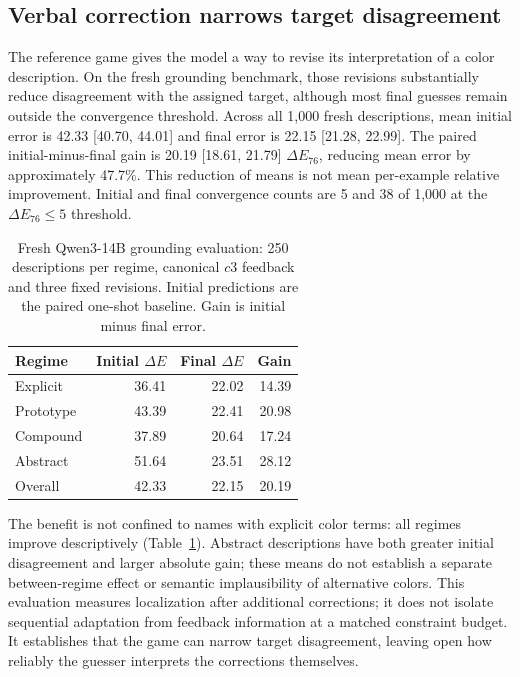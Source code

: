 \documentclass[11pt]{article}
\begin{document}
\subsection{Verbal correction narrows target disagreement}
\label{sec:results_main}
The reference game gives the model a way to revise its interpretation of a
color description. On the fresh grounding benchmark, those revisions
substantially reduce disagreement with the assigned target, although
most final guesses remain outside the convergence threshold.
Across all 1{,}000 fresh descriptions, mean initial error is 42.33
[40.70, 44.01] and final error is 22.15 [21.28, 22.99]. The paired
initial-minus-final gain is 20.19 [18.61, 21.79] $\Delta E_{76}$, reducing
mean error by approximately 47.7\%. This reduction of means is not mean
per-example relative improvement. Initial and final convergence counts
are 5 and 38 of 1{,}000 at the $\Delta E_{76}\leq5$ threshold.

\begin{table}[t]
\centering\small
\begin{tabular}{@{}lrrr@{}}
\toprule
Regime & Initial $\Delta E$ & Final $\Delta E$ & Gain \\
\midrule
Explicit & 36.41 & 22.02 & 14.39 \\
Prototype & 43.39 & 22.41 & 20.98 \\
Compound & 37.89 & 20.64 & 17.24 \\
Abstract & 51.64 & 23.51 & 28.12 \\
Overall & 42.33 & 22.15 & 20.19 \\
\bottomrule
\end{tabular}
\caption{Fresh Qwen3-14B grounding evaluation: 250 descriptions per regime,
canonical $c3$ feedback and three fixed revisions. Initial predictions are
the paired one-shot baseline. Gain is initial minus final error.}
\label{tab:main_results}
\end{table}

The benefit is not confined to names with explicit color terms: all
regimes improve descriptively (Table~\ref{tab:main_results}). Abstract
descriptions have both greater initial disagreement and larger absolute
gain; these means do not establish a separate between-regime effect or
semantic implausibility of alternative colors. This evaluation measures
localization after additional corrections; it does not isolate sequential
adaptation from feedback information at a matched constraint budget.
It establishes that the game can narrow target disagreement, leaving open
how reliably the guesser interprets the corrections themselves.
\end{document}
